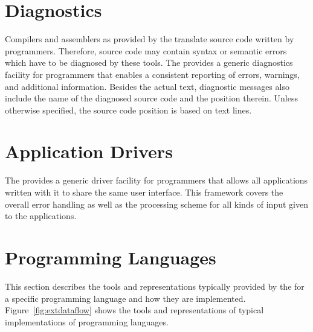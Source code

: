\section{Diagnostics}

Compilers and assemblers as provided by the \ecs{} translate source code written by programmers.
Therefore, source code may contain syntax or semantic errors which have to be diagnosed by these tools.
The \ecs{} provides a generic diagnostics facility for programmers that enables a consistent reporting of errors, warnings, and additional information.
Besides the actual text, diagnostic messages also include the name of the diagnosed source code and the position therein.
Unless otherwise specified, the source code position is based on text lines.

\section{Application Drivers}

The \ecs{} provides a generic driver facility for programmers that allows all applications written with it to share the same user interface.
This framework covers the overall error handling as well as the processing scheme for all kinds of input given to the applications.
\interface

\section{Programming Languages}

This section describes the tools and representations typically provided by the \ecs{} for a specific programming language and how they are implemented.
Figure~\ref{fig:extdataflow} shows the tools and representations of typical implementations of programming languages.

